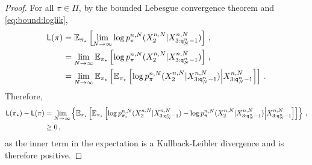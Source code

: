 \begin{proof}
For all $\pi\in\Pi$, by the bounded Lebesgue convergence theorem and \eqref{eq:bound:loglik},
\begin{align*}
\mathsf{L}(\pi) &= \mathbb{E}_{\pi_{\star}}\left[\lim_{N\to \infty}\log p_{\pi}^{n,N}(X_{2}^{n,N}|X_{3:{\mathsf{q}}^{n}_{N}-1}^{n,N})\right]\,,\\ 
&= \lim_{N\to \infty}\mathbb{E}_{\pi_{\star}}\left[\log p_{\pi}^{n,N}(X_{2}^{n,N}|X_{3:{\mathsf{q}}^{n}_{N}-1}^{n,N})\right]\,,\\
&= \lim_{N\to \infty}\mathbb{E}_{\pi_{\star}}\left[\mathbb{E}_{\pi_{\star}}\left[\log p_{\pi}^{n,N}(X_{2}^{n,N}|X_{3:{\mathsf{q}}^{n}_{N}-1}^{n,N})\middle|X_{3:{\mathsf{q}}^{n}_{N}-1}^{n,N}\right]\right]\,.
\end{align*}
Therefore, 
\begin{align*}
\mathsf{L}(\pi_{\star}) - \mathsf{L}(\pi) &=  \lim_{N\to \infty}\left\{\mathbb{E}_{\pi_{\star}}\left[\mathbb{E}_{\pi_{\star}}\left[\log p_{\pi_{\star}}^{n,N}(X_{2}^{n,N}|X_{3:{\mathsf{q}}^{n}_{N}-1}^{n,N}) - \log p_{\pi}^{n,N}(X_{2}^{n,N}|X_{3:{\mathsf{q}}^{n}_{N}-1}^{n,N})\middle|X_{3:{\mathsf{q}}^{n}_{N}-1}^{n,N}\right]\right]\right\}\,,\\
&\ge 0\,,
\end{align*}
as the inner term in the expectation is a Kullback-Leibler divergence and is therefore positive.
\end{proof}



